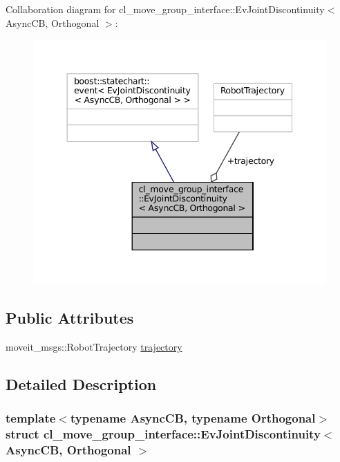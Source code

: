 Collaboration diagram for cl\+\_\+move\+\_\+group\+\_\+interface\+:\+:Ev\+Joint\+Discontinuity$<$ Async\+CB, Orthogonal $>$\+:
\nopagebreak
\begin{figure}[H]
\begin{center}
\leavevmode
\includegraphics[width=344pt]{structcl__move__group__interface_1_1EvJointDiscontinuity__coll__graph}
\end{center}
\end{figure}
\subsection*{Public Attributes}
\begin{DoxyCompactItemize}
\item 
moveit\+\_\+msgs\+::\+Robot\+Trajectory \hyperlink{structcl__move__group__interface_1_1EvJointDiscontinuity_a6ccc8c9247d286b2c7dae1746357831b}{trajectory}
\end{DoxyCompactItemize}


\subsection{Detailed Description}
\subsubsection*{template$<$typename Async\+CB, typename Orthogonal$>$\newline
struct cl\+\_\+move\+\_\+group\+\_\+interface\+::\+Ev\+Joint\+Discontinuity$<$ Async\+C\+B, Orthogonal $>$}



